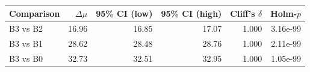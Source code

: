 \begin{tabular}{lrrrrr}
\toprule
Comparison & $\Delta\mu$ & 95\% CI (low) & 95\% CI (high) & Cliff's $\delta$ & Holm-$p$\\
\midrule
B3 vs B2 & 16.96 & 16.85 & 17.07 & 1.000 & 3.16e-99\\
B3 vs B1 & 28.62 & 28.48 & 28.76 & 1.000 & 2.11e-99\\
B3 vs B0 & 32.73 & 32.51 & 32.95 & 1.000 & 1.05e-99\\
\bottomrule
\end{tabular}